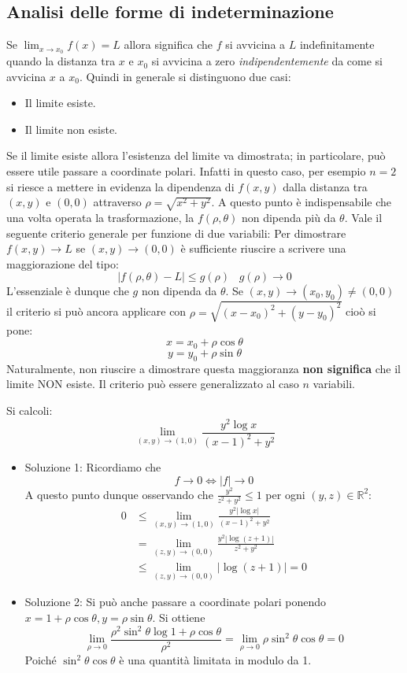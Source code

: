 \documentclass[a4paper]{article}
\numberwithin{equation}{subsection}
\begin{document}
\subsection{Analisi delle forme di indeterminazione}

Se $\lim_{x \rightarrow x_0} f(x) = L$ allora significa che $f$ si avvicina a $L$ indefinitamente quando la distanza
tra $x$ e $x_0$ si avvicina a zero \textit{indipendentemente} da come si avvicina $x$ a $x_0$. Quindi in generale si distinguono due casi:

\begin{itemize}
    \item Il limite esiste.
    \item Il limite non esiste.
\end{itemize}
\noindent
Se il limite esiste allora l'esistenza del limite va dimostrata; in particolare, può essere utile passare a coordinate polari.
Infatti in questo caso, per esempio $n = 2$ si riesce a mettere in evidenza la dipendenza di $f(x,y)$ dalla distanza tra $(x,y)$ e $(0,0)$ attraverso 
$\rho = \sqrt{x^2 + y^2}$. A questo punto è indispensabile che una volta operata la trasformazione, la $f(\rho, \theta)$ non dipenda più da $\theta$.
Vale il seguente criterio generale per funzione di due variabili:
{
    Per dimostrare $f(x,y) \rightarrow L$ se $(x,y) \rightarrow (0,0)$ è sufficiente riuscire a scrivere una maggiorazione del tipo:
    \[|f(\rho, \theta) - L| \le g(\rho) \; \; \; g(\rho) \rightarrow 0\]
    L'essenziale è dunque che $g$ non dipenda da $\theta$.
} 
\noindent
Se $(x,y) \rightarrow (x_0, y_0) \neq (0,0)$ il criterio si può ancora applicare con $\rho = \sqrt{(x-x_0)^2  + (y - y_0)^2}$ cioò si pone:
\[x = x_0 + \rho \cos{\theta}\]
\[y = y_0 + \rho \sin{\theta}\]
Naturalmente, non riuscire a dimostrare questa maggioranza \textbf{non significa} che il limite NON esiste.
Il criterio può essere generalizzato al caso $n$ variabili. 
\ex{}
{
    Si calcoli:
    \[\lim_{(x,y) \rightarrow (1,0)} \frac{y^2\log{x}}{(x-1)^2 + y^2}\]
    \begin{itemize}
        \item Soluzione 1: Ricordiamo che
        \[f \rightarrow 0 \Longleftrightarrow |f| \rightarrow 0\]
        A questo punto dunque osservando che $\frac{y^2}{z^2 + y^2} \le 1$ per ogni $(y,z) \in \mathbb{R}^2$:
        \begin{align*}
            0 &\le \lim_{(x,y) \rightarrow (1,0)} \frac{y^2|\log{x}|}{(x-1)^2 + y^2}\\
            &= \lim_{(z,y) \rightarrow (0,0)} \frac{y^2|\log{(z+1)}|}{z^2 + y^2}\\
            &\le \lim_{(z,y) \rightarrow (0,0)} |\log{(z+1)}| = 0
        \end{align*}
        \item Soluzione 2: Si può anche passare a coordinate polari ponendo $x= 1 + \rho \cos{\theta}, y = \rho \sin{\theta}$. Si ottiene 
        \[\lim_{\rho \rightarrow 0} \frac{\rho^2 \sin^2{\theta} \log{1 + \rho \cos{\theta}}}{\rho^2} = \lim_{\rho \rightarrow 0} \rho \sin^2{\theta}\cos{\theta} = 0\]
        Poiché $\sin^2{\theta}\cos{\theta}$ è una quantità limitata in modulo da 1.  
    \end{itemize}
}
\end{document}
